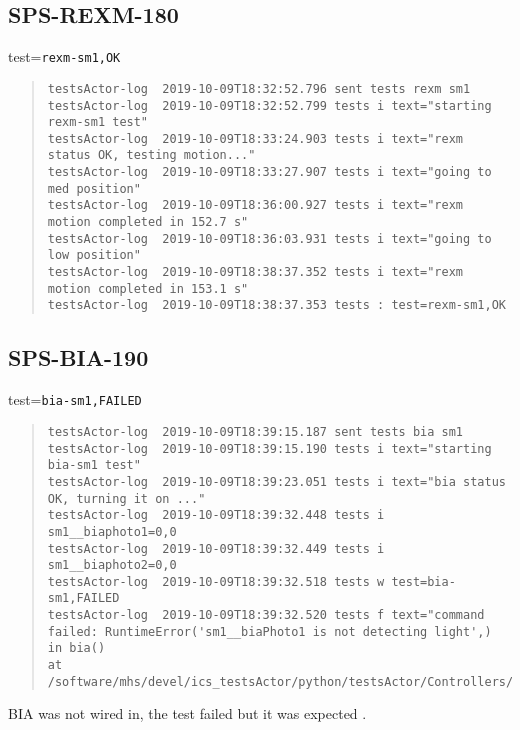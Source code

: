 \subsection{SPS-REXM-180}
\label{sec:tc-180}

test=\texttt{rexm-sm1,OK}

\begin{quote}
\begin{tiny}
\begin{verbatim}
testsActor-log  2019-10-09T18:32:52.796 sent tests rexm sm1
testsActor-log  2019-10-09T18:32:52.799 tests i text="starting rexm-sm1 test"
testsActor-log  2019-10-09T18:33:24.903 tests i text="rexm status OK, testing motion..."
testsActor-log  2019-10-09T18:33:27.907 tests i text="going to med position"
testsActor-log  2019-10-09T18:36:00.927 tests i text="rexm motion completed in 152.7 s"
testsActor-log  2019-10-09T18:36:03.931 tests i text="going to low position"
testsActor-log  2019-10-09T18:38:37.352 tests i text="rexm motion completed in 153.1 s"
testsActor-log  2019-10-09T18:38:37.353 tests : test=rexm-sm1,OK
\end{verbatim}
\end{tiny}
\end{quote}

\subsection{SPS-BIA-190}
\label{sec:tc-190}

test=\texttt{bia-sm1,FAILED}

\begin{quote}
\begin{tiny}
\begin{verbatim}
testsActor-log  2019-10-09T18:39:15.187 sent tests bia sm1
testsActor-log  2019-10-09T18:39:15.190 tests i text="starting bia-sm1 test"
testsActor-log  2019-10-09T18:39:23.051 tests i text="bia status OK, turning it on ..."
testsActor-log  2019-10-09T18:39:32.448 tests i sm1__biaphoto1=0,0
testsActor-log  2019-10-09T18:39:32.449 tests i sm1__biaphoto2=0,0
testsActor-log  2019-10-09T18:39:32.518 tests w test=bia-sm1,FAILED
testsActor-log  2019-10-09T18:39:32.520 tests f text="command failed: RuntimeError('sm1__biaPhoto1 is not detecting light',) in bia()
at /software/mhs/devel/ics_testsActor/python/testsActor/Controllers/enu.py:119"
\end{verbatim}
\end{tiny}
\end{quote}
\noindent BIA was not wired in, the test failed but it was expected .

